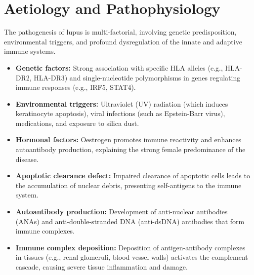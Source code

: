 \section*{Aetiology and Pathophysiology}
The pathogenesis of lupus is multi-factorial, involving genetic predisposition, environmental triggers, and profound dysregulation of the innate and adaptive immune systems.
\begin{itemize}
    \item \textbf{Genetic factors:} Strong association with specific HLA alleles (e.g., HLA-DR2, HLA-DR3) and single-nucleotide polymorphisms in genes regulating immune responses (e.g., IRF5, STAT4).
    \item \textbf{Environmental triggers:} Ultraviolet (UV) radiation (which induces keratinocyte apoptosis), viral infections (such as Epstein-Barr virus), medications, and exposure to silica dust.
    \item \textbf{Hormonal factors:} Oestrogen promotes immune reactivity and enhances autoantibody production, explaining the strong female predominance of the disease.
    \item \textbf{Apoptotic clearance defect:} Impaired clearance of apoptotic cells leads to the accumulation of nuclear debris, presenting self-antigens to the immune system.
    \item \textbf{Autoantibody production:} Development of anti-nuclear antibodies (ANAs) and anti-double-stranded DNA (anti-dsDNA) antibodies that form immune complexes.
    \item \textbf{Immune complex deposition:} Deposition of antigen-antibody complexes in tissues (e.g., renal glomeruli, blood vessel walls) activates the complement cascade, causing severe tissue inflammation and damage.
\end{itemize}

